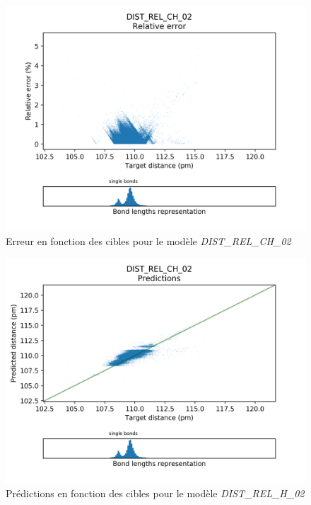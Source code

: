 \begin{figure}[!h]
	\centering
	
	\includegraphics[scale=0.8]{../figures/DIST_REL_CH_02/DIST_REL_CH_02_distrib_rmse_dist.png}	
	
	\caption{Erreur en fonction des cibles pour le modèle \emph{DIST\_REL\_CH\_02}}
\end{figure}

\begin{figure}[!h]
	\centering
	
	\includegraphics[scale=0.8]{../figures/DIST_REL_CH_02/DIST_REL_CH_02_preds_targets.png}	
	
	\caption{Prédictions en fonction des cibles pour le modèle \emph{DIST\_REL\_H\_02}}
	
\end{figure}



